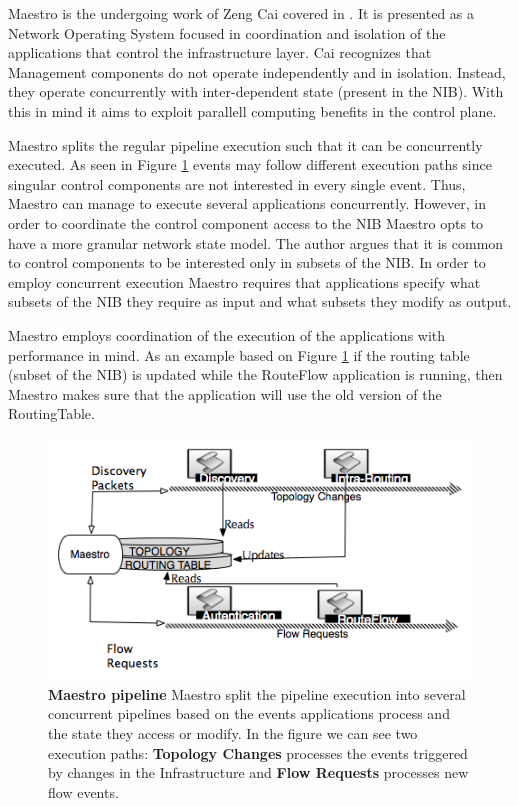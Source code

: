 \documentclass[12pt,openright,twoside]{report}
\begin{document}
\begin{itemize}
Maestro is the undergoing work of Zeng Cai covered in
\cite{maestro}. It is presented as a Network Operating System focused
in coordination and isolation of the applications  that control the
infrastructure layer. Cai recognizes that Management components do not
operate independently and in isolation. Instead, they operate
concurrently with inter-dependent state (present in the NIB). With this in mind
it aims to exploit parallell computing benefits in the control plane. 

Maestro splits the regular pipeline execution such that it can
be concurrently executed. As seen in Figure \ref{fig:maestro-pipeline} events may
follow different execution paths since singular control components are
not interested in every single event. Thus, Maestro can manage to
execute several applications concurrently. However, in order to
coordinate the control component access to the NIB Maestro opts to
have a more granular network state model. The author argues that it is
common to control components to be  interested only in  subsets of the
NIB. In order to employ concurrent execution Maestro requires that
applications specify  what subsets of the NIB they require as input
and what subsets they modify as output. 

Maestro employs
coordination of the  execution of the applications with performance in
mind. As an example based on Figure \ref{fig:maestro-pipeline} if the routing table
(subset of the NIB) is updated while the RouteFlow application is running, then
Maestro makes sure that the application will use the old version of
the RoutingTable.

\begin{figure}
  \centering 
  \footnotesize
  \includegraphics[scale=0.5]{pic/maestro-pipeline.png}
  \caption[Maestro pipeline]{\textbf{Maestro pipeline} Maestro split the pipeline execution
  into several concurrent pipelines based on the events applications
  process and the state they access or modify. In the figure we can
  see two execution paths: \textbf{Topology Changes} processes the
  events triggered by changes in the Infrastructure and \textbf{Flow
    Requests} processes new flow events.}
  \label{fig:maestro-pipeline}
\end{figure}



\end{itemize}
\end{document}
